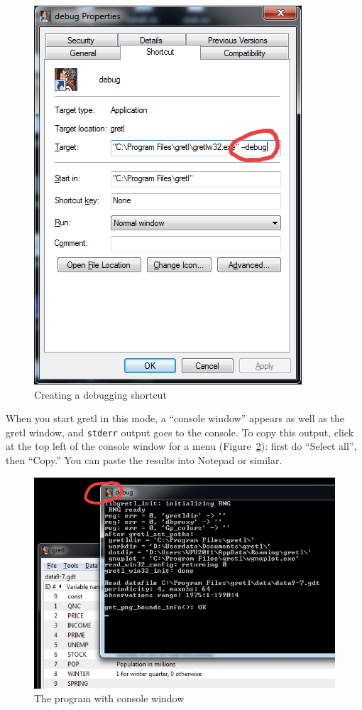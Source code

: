 \begin{figure}[htbp]
  \centering
  \caption{Creating a debugging shortcut}
  \vspace{1ex}
  \label{fig:gretl-shortcut}
  \includegraphics[scale=0.8]{figures/gretl-shortcut}
\end{figure}

When you start gretl in this mode, a ``console window'' appears as
well as the gretl window, and \texttt{stderr} output goes to the
console. To copy this output, click at the top left of the console
window for a menu (Figure~\ref{fig:gretl-debug}): first do ``Select
all'', then ``Copy.'' You can paste the results into Notepad or
similar.

\begin{figure}[htbp]
  \centering
  \caption{The program with console window}
  \label{fig:gretl-debug}
  \includegraphics[scale=0.8]{figures/gretl-debug}
\end{figure}


